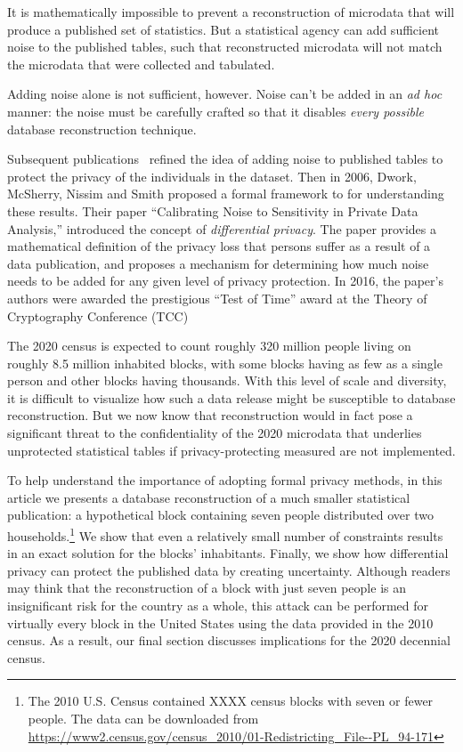 \documentclass[runningheads]{llncs}
\begin{document}
It is mathematically impossible to prevent a reconstruction of
microdata that will produce a published set of statistics. But a
statistical agency can add sufficient noise to the published tables, such that
reconstructed microdata will not match the microdata that were
collected and tabulated. 

Adding noise alone is not sufficient, however. Noise can't be added in an \emph{ad
  hoc} manner: the noise must be carefully crafted so that it disables
\emph{every possible} database reconstruction technique. 

Subsequent
publications~\cite{privacy-preserving-datamining-on-vertically-partitioned-databases,BDMN05}
refined the idea of adding noise to published tables to protect the
privacy of the individuals in the dataset. Then in 2006, Dwork, McSherry, Nissim and Smith proposed a formal framework
to for understanding these results. Their paper ``Calibrating Noise to Sensitivity in Private Data
Analysis,''\cite{Dwork:2006:CNS:2180286.2180305} 
introduced the concept of \emph{differential privacy}. The paper
provides a mathematical definition of the privacy loss that
persons suffer as a result of a data publication, and proposes a
mechanism for determining how much noise needs to be added for any
given level of privacy protection. In 2016, the paper's authors were awarded the
prestigious ``Test of Time'' award at the Theory of Cryptography
Conference (TCC)

The 2020 census is expected to count roughly 320 million people living
on roughly 8.5 million inhabited blocks, with some blocks having as
few as a single person and other blocks having thousands. With this
level of scale and diversity, it is difficult to visualize how such a
data release might be susceptible to database reconstruction. But we
now know that reconstruction would in fact pose a significant threat
to the confidentiality of the 2020 microdata that underlies
unprotected statistical tables if privacy-protecting measured are not
implemented. 

To help understand the importance of adopting formal privacy methods, in
this article we presents a database reconstruction of a much
smaller statistical publication: a hypothetical block containing seven
people distributed over two households.\footnote{The 2010 U.S. Census contained XXXX census blocks with seven or fewer people. The data can be downloaded from \url{https://www2.census.gov/census_2010/01-Redistricting_File--PL_94-171}} We show that even a relatively
small number of constraints results in an exact solution for the blocks'
inhabitants. Finally, we show how differential privacy can protect the
published data by creating uncertainty. Although readers may think
that the reconstruction of a block with just seven people is an
insignificant risk for the country as a whole, this attack can be
performed for virtually every block in the United States using the
data provided in the 2010 census. As a result, our final section discusses
implications for the 2020 decennial census.
\end{document}

